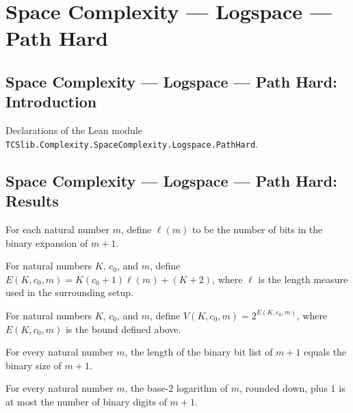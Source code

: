 \section{Space Complexity --- Logspace --- Path Hard}
\subsection*{Space Complexity --- Logspace --- Path Hard: Introduction}

Declarations of the Lean module \texttt{TCSlib.Complexity.SpaceComplexity.Logspace.PathHard}.

\subsection*{Space Complexity --- Logspace --- Path Hard: Results}

\begin{definition}
\label{Complexity.PathHard.ell}
\leanok
For each natural number $m$, define $\ell(m)$ to be the number of bits in the binary
expansion of $m+1$.
\end{definition}

\begin{definition}
\label{Complexity.PathHard.expo}
\leanok
{}
For natural numbers $K$, $c_0$, and $m$, define $E(K,c_0,m)=K(c_0+1)\ell(m)+(K+2)$,
where $\ell$ is the length measure used in the surrounding setup.
\end{definition}

\begin{definition}
\label{Complexity.PathHard.nV}
\leanok
{}
For natural numbers $K$, $c_0$, and $m$, define $V(K,c_0,m)=2^{E(K,c_0,m)}$, where
$E(K,c_0,m)$ is the bound defined above.
\end{definition}

\begin{lemma}
\label{Complexity.PathHard.ell_eq_size}
\leanok
{}
For every natural number $m$, the length of the binary bit list of $m+1$ equals the
binary size of $m+1$.
\end{lemma}

\begin{lemma}
\label{Complexity.PathHard.logSpace_le_ell}
\leanok
{}
For every natural number $m$, the base-$2$ logarithm of $m$, rounded down, plus $1$ is
at most the number of binary digits of $m+1$.
\end{lemma}


